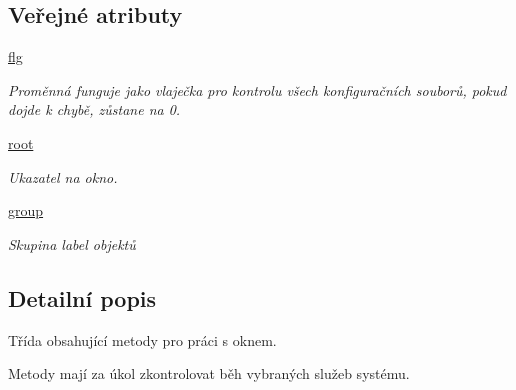 \subsection*{Veřejné atributy}
\begin{DoxyCompactItemize}
\item 
\hypertarget{classtestsServices_1_1App_a5e628817705785809aac69720699a071}{\hyperlink{classtestsServices_1_1App_a5e628817705785809aac69720699a071}{flg}}\label{d7/df4/classtestsServices_1_1App_a5e628817705785809aac69720699a071}

\begin{DoxyCompactList}\small\item\em Proměnná funguje jako vlaječka pro kontrolu všech konfiguračních souborů, pokud dojde k chybě, zůstane na 0. \end{DoxyCompactList}\item 
\hypertarget{classtestsServices_1_1App_ae057ca5e1d4127096617c14c615a5cd7}{\hyperlink{classtestsServices_1_1App_ae057ca5e1d4127096617c14c615a5cd7}{root}}\label{d7/df4/classtestsServices_1_1App_ae057ca5e1d4127096617c14c615a5cd7}

\begin{DoxyCompactList}\small\item\em Ukazatel na okno. \end{DoxyCompactList}\item 
\hypertarget{classtestsServices_1_1App_a1549120a798c7368dee93b4ba094dc0f}{\hyperlink{classtestsServices_1_1App_a1549120a798c7368dee93b4ba094dc0f}{group}}\label{d7/df4/classtestsServices_1_1App_a1549120a798c7368dee93b4ba094dc0f}

\begin{DoxyCompactList}\small\item\em Skupina label objektů \end{DoxyCompactList}\end{DoxyCompactItemize}


\subsection{Detailní popis}
Třída obsahující metody pro práci s oknem. 

Metody mají za úkol zkontrolovat běh vybraných služeb systému. 


